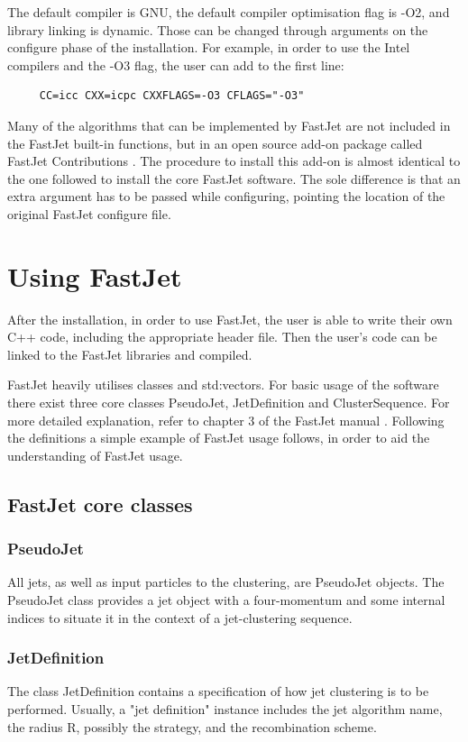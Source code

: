 The default compiler is GNU, the default compiler optimisation flag is -O2, and library linking is dynamic. Those can be changed through arguments on the configure phase of the installation. For example, in order to use the Intel compilers and the -O3 flag, the user can add to the first line:

\begin{lstlisting}
     CC=icc CXX=icpc CXXFLAGS=-O3 CFLAGS="-O3"
\end{lstlisting} 

Many of the algorithms that can be implemented by FastJet are not included in the FastJet built-in functions, but in an open source add-on package called FastJet Contributions \cite{fjcontrib}. The procedure to install this add-on is almost identical to the one followed to install the core FastJet software. The sole difference is that an extra argument has to be passed while configuring, pointing the location of the original FastJet configure file.

\section{Using FastJet}
After the installation, in order to use FastJet, the user is able to write their own C++ code, including the appropriate header file. Then the user's code can be linked to the FastJet libraries and compiled. 

FastJet heavily utilises classes and std:vectors. For basic usage of the software there exist three core classes PseudoJet, JetDefinition and ClusterSequence. For more detailed explanation, refer to chapter 3 of the FastJet manual \cite{cacciari2012fastjet}. Following the definitions a simple example of FastJet usage follows, in order to aid the understanding of FastJet usage.

\subsection{FastJet core classes}
\subsubsection{PseudoJet}\label{ch:pseudojet}
All jets, as well as input particles to the clustering, are PseudoJet objects. The PseudoJet class provides a jet object with a four-momentum and some internal indices to situate it in the context of a jet-clustering sequence.

\subsubsection{JetDefinition}
The class JetDefinition contains a specification of how jet clustering is to be performed. Usually, a "jet definition" instance includes the jet algorithm name, the radius R,  possibly the strategy, and the recombination scheme. 

